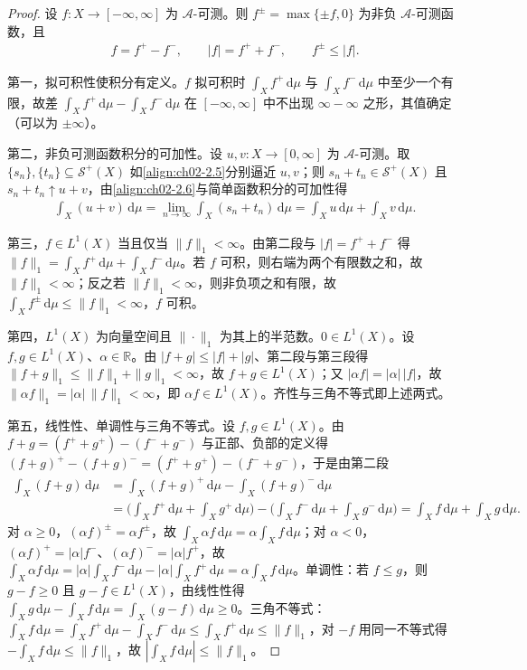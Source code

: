 \documentclass[../../main.tex]{subfiles}%
\begin{document}
\begin{proof}
设 $f:X\to[-\infty,\infty]$ 为 $\mathscr A$-可测。则 $f^\pm=\max\{\pm f,0\}$ 为非负 $\mathscr A$-可测函数，且
\begin{align*}
f=f^+-f^-,\qquad|f|=f^++f^-,\qquad f^\pm\leqslant|f|.
\end{align*}

第一，拟可积性使积分有定义。$f$ 拟可积时 $\int_Xf^+\,\mathrm{d}\mu$ 与 $\int_Xf^-\,\mathrm{d}\mu$ 中至少一个有限，故差 $\int_Xf^+\,\mathrm{d}\mu-\int_Xf^-\,\mathrm{d}\mu$ 在 $[-\infty,\infty]$ 中不出现 $\infty-\infty$ 之形，其值确定（可以为 $\pm\infty$）。

第二，非负可测函数积分的可加性。设 $u,v:X\to[0,\infty]$ 为 $\mathscr A$-可测。取 $\{s_n\},\{t_n\}\subseteq\mathscr S^+(X)$ 如\eqref{align:ch02-2.5}分别逼近 $u,v$；则 $s_n+t_n\in\mathscr S^+(X)$ 且 $s_n+t_n\uparrow u+v$，由\eqref{align:ch02-2.6}与简单函数积分的可加性得
\begin{align*}
\int_X(u+v)\,\mathrm{d}\mu=\lim_{n\to\infty}\int_X(s_n+t_n)\,\mathrm{d}\mu=\int_Xu\,\mathrm{d}\mu+\int_Xv\,\mathrm{d}\mu.
\end{align*}

第三，$f\in L^1(X)$ 当且仅当 $\|f\|_1<\infty$。由第二段与 $|f|=f^++f^-$ 得 $\|f\|_1=\int_Xf^+\,\mathrm{d}\mu+\int_Xf^-\,\mathrm{d}\mu$。若 $f$ 可积，则右端为两个有限数之和，故 $\|f\|_1<\infty$；反之若 $\|f\|_1<\infty$，则非负项之和有限，故 $\int_Xf^\pm\,\mathrm{d}\mu\leqslant\|f\|_1<\infty$，$f$ 可积。

第四，$L^1(X)$ 为向量空间且 $\|\cdot\|_1$ 为其上的半范数。$0\in L^1(X)$。设 $f,g\in L^1(X)$、$\alpha\in\mathbb R$。由 $|f+g|\leqslant|f|+|g|$、第二段与第三段得 $\|f+g\|_1\leqslant\|f\|_1+\|g\|_1<\infty$，故 $f+g\in L^1(X)$；又 $|\alpha f|=|\alpha|\,|f|$，故 $\|\alpha f\|_1=|\alpha|\,\|f\|_1<\infty$，即 $\alpha f\in L^1(X)$。齐性与三角不等式即上述两式。

第五，线性性、单调性与三角不等式。设 $f,g\in L^1(X)$。由 $f+g=(f^++g^+)-(f^-+g^-)$ 与正部、负部的定义得 $(f+g)^+-(f+g)^-=(f^++g^+)-(f^-+g^-)$，于是由第二段
\begin{align*}
\int_X(f+g)\,\mathrm{d}\mu
&=\int_X(f+g)^+\,\mathrm{d}\mu-\int_X(f+g)^-\,\mathrm{d}\mu\\
&=\Big(\int_Xf^+\,\mathrm{d}\mu+\int_Xg^+\,\mathrm{d}\mu\Big)-\Big(\int_Xf^-\,\mathrm{d}\mu+\int_Xg^-\,\mathrm{d}\mu\Big)
=\int_Xf\,\mathrm{d}\mu+\int_Xg\,\mathrm{d}\mu.
\end{align*}
对 $\alpha\geqslant0$，$(\alpha f)^\pm=\alpha f^\pm$，故 $\int_X\alpha f\,\mathrm{d}\mu=\alpha\int_Xf\,\mathrm{d}\mu$；对 $\alpha<0$，$(\alpha f)^+=|\alpha|f^-$、$(\alpha f)^-=|\alpha|f^+$，故 $\int_X\alpha f\,\mathrm{d}\mu=|\alpha|\int_Xf^-\,\mathrm{d}\mu-|\alpha|\int_Xf^+\,\mathrm{d}\mu=\alpha\int_Xf\,\mathrm{d}\mu$。单调性：若 $f\leqslant g$，则 $g-f\geqslant0$ 且 $g-f\in L^1(X)$，由线性性得 $\int_Xg\,\mathrm{d}\mu-\int_Xf\,\mathrm{d}\mu=\int_X(g-f)\,\mathrm{d}\mu\geqslant0$。三角不等式：$\int_Xf\,\mathrm{d}\mu=\int_Xf^+\,\mathrm{d}\mu-\int_Xf^-\,\mathrm{d}\mu\leqslant\int_Xf^+\,\mathrm{d}\mu\leqslant\|f\|_1$，对 $-f$ 用同一不等式得 $-\int_Xf\,\mathrm{d}\mu\leqslant\|f\|_1$，故 $\left|\int_Xf\,\mathrm{d}\mu\right|\leqslant\|f\|_1$。


\end{proof}
\end{document}
